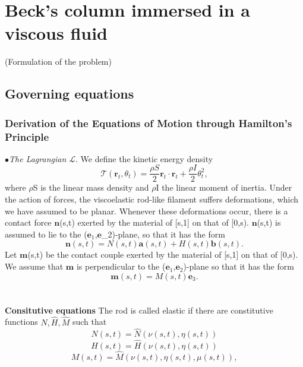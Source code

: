 \documentclass[12pt]{article}
\begin{document}
\section{Beck’s column immersed in a viscous fluid}
(Formulation of the problem)
\subsection{Governing equations}\label{Governing equations}
\subsubsection{Derivation of the Equations of Motion through  Hamilton's Principle}
$\bullet$\emph{The Lagrangian $\mathcal{L}$}. We define the kinetic energy density 
\[ \mathcal{T}(\mathbf{r}_t, \theta_t) = \frac{\rho S}{2} \mathbf{r}_t \cdot \mathbf{r}_t + \frac{\rho I}{2}\theta_t ^2,
\]
where $\rho$S is the linear mass density and $\rho$I the linear moment of inertia.
Under the action of forces, the viscoelastic rod-like filament suffers deformations, which we have assumed to be planar. Whenever these deformations occur, there is a contact force
$\mathbf{n}$(s,t) exerted by the material of [s,1] on that of [0,s). $\mathbf{n}$(s,t) is assumed to lie to the ($\mathbf{e}_1$,$\mathbf{e}$_2)-plane, so that it has the form
\[  \mathbf{n}(s,t)= N(s,t) \mathbf{a}(s,t) + H(s,t)\mathbf{b} (s,t).
\]
Let $\mathbf{m}$(s,t) be the contact couple exerted by the material of [s,1] on that of [0,s). We assume that $\mathbf{m}$ is perpendicular to the ($\mathbf{e}_1$,$\mathbf{e}_2$)-plane so that it has the form
\[ 
\mathbf{m}(s,t) = M(s,t)\mathbf{e}_3.
\]
\\\\
\textbf{Consitutive equations} 
The rod is called elastic if there are constitutive functions $\hat{N}, \hat{H}, \hat{M}$ such that
\[  N (s,t)=  \hat{N}(\nu (s,t),\eta (s,t))
\]
\[  H (s,t)=  \hat{H}(\nu (s,t),\eta (s,t)) 
\]
\[  M (s,t)=  \hat{M}(\nu (s,t),\eta (s,t), \mu(s,t)),
\]
\end{document}
